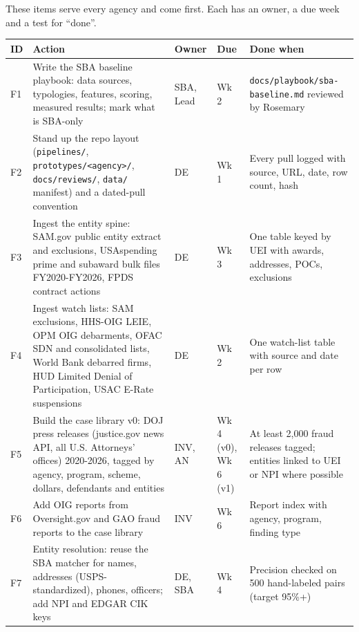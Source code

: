 \documentclass[letterpaper,11pt]{article}
\begin{document}
These items serve every agency and come first. Each has an owner, a due
week and a test for ``done''.

\begingroup\small\setlength{\tabcolsep}{4pt}\renewcommand{\arraystretch}{1.25}
\begin{longtable}[l]{@{}l>{\raggedright\arraybackslash}p{}l>{\raggedright\arraybackslash}p{}>{\raggedright\arraybackslash}p{}@{}}
\rowcolor{coolblack}\leavevmode\color{white}\bfseries ID & \leavevmode\color{white}\bfseries Action & \leavevmode\color{white}\bfseries Owner & \leavevmode\color{white}\bfseries Due & \leavevmode\color{white}\bfseries Done when \\
\endhead
F1 & Write the SBA baseline playbook: data sources, typologies, features, scoring, measured results; mark what is SBA-only & SBA, Lead & Wk 2 & \texttt{docs/playbook/sba-baseline.md} reviewed by Rosemary \\
F2 & Stand up the repo layout (\texttt{pipelines/}, \texttt{prototypes/\textless{}agency\textgreater{}/}, \texttt{docs/reviews/}, \texttt{data/} manifest) and a dated-pull convention & DE & Wk 1 & Every pull logged with source, URL, date, row count, hash \\
F3 & Ingest the entity spine: SAM.gov public entity extract and exclusions, USAspending prime and subaward bulk files FY2020-FY2026, FPDS contract actions & DE & Wk 3 & One table keyed by UEI with awards, addresses, POCs, exclusions \\
F4 & Ingest watch lists: SAM exclusions, HHS-OIG LEIE, OPM OIG debarments, OFAC SDN and consolidated lists, World Bank debarred firms, HUD Limited Denial of Participation, USAC E-Rate suspensions & DE & Wk 2 & One watch-list table with source and date per row \\
F5 & Build the case library v0: DOJ press releases (justice.gov news API, all U.S. Attorneys' offices) 2020-2026, tagged by agency, program, scheme, dollars, defendants and entities & INV, AN & Wk 4 (v0), Wk 6 (v1) & At least 2,000 fraud releases tagged; entities linked to UEI or NPI where possible \\
F6 & Add OIG reports from Oversight.gov and GAO fraud reports to the case library & INV & Wk 6 & Report index with agency, program, finding type \\
F7 & Entity resolution: reuse the SBA matcher for names, addresses (USPS-standardized), phones, officers; add NPI and EDGAR CIK keys & DE, SBA & Wk 4 & Precision checked on 500 hand-labeled pairs (target 95\%+) \\

\end{longtable}
\end{document}
